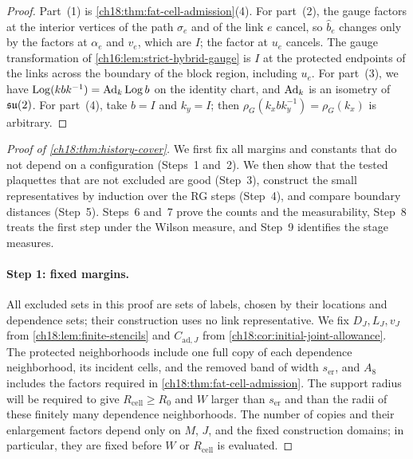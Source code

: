 \begin{proof}
Part~(1) is \cref{ch18:thm:fat-cell-admission}(4). For part~(2), the gauge factors at the interior vertices of the path $\sigma_e$ and of the link $e$ cancel, so $\widehat b_e$ changes only by the factors at $\alpha_e$ and $v_e$, which are $I$; the factor at $u_e$ cancels. The gauge transformation of \cref{ch16:lem:strict-hybrid-gauge} is $I$ at the protected endpoints of the links across the boundary of the block region, including $u_e$. For part~(3), we have $\operatorname{Log}(kbk^{-1})=\operatorname{Ad}_k\operatorname{Log} b$ on the identity chart, and $\operatorname{Ad}_k$ is an isometry of $\mathfrak{su}(2)$. For part~(4), take $b=I$ and $k_y=I$; then $\rho_G(k_xbk_y^{-1})=\rho_G(k_x)$ is arbitrary.
\end{proof}

\begin{proof}[Proof of \cref{ch18:thm:history-cover}]
We first fix all margins and constants that do not depend on a configuration (Steps~1 and~2). We then show that the tested plaquettes that are not excluded are good (Step~3), construct the small representatives by induction over the RG steps (Step~4), and compare boundary distances (Step~5). Steps~6 and~7 prove the counts and the measurability, Step~8 treats the first step under the Wilson measure, and Step~9 identifies the stage measures.

\paragraph{Step 1: fixed margins.}
All excluded sets in this proof are sets of labels, chosen by their locations and dependence sets; their construction uses no link representative. We fix $D_J,L_J,v_J$ from \cref{ch18:lem:finite-stencils} and $C_{\mathrm{ad},J}$ from \cref{ch18:cor:initial-joint-allowance}. The protected neighborhoods include one full copy of each dependence neighborhood, its incident cells, and the removed band of width $s_{\mathrm{er}}$, and $A_8$ includes the factors required in \cref{ch18:thm:fat-cell-admission}. The support radius will be required to give $R_{\mathrm{cell}}\ge R_0$ and $W$ larger than $s_{\mathrm{er}}$ and than the radii of these finitely many dependence neighborhoods. The number of copies and their enlargement factors depend only on $M$, $J$, and the fixed construction domains; in particular, they are fixed before $W$ or $R_{\mathrm{cell}}$ is evaluated.


\end{proof}
